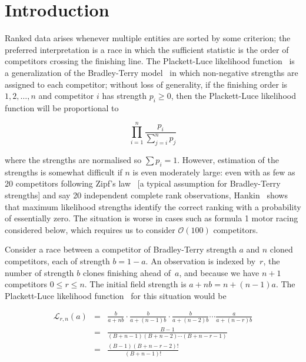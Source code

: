 \documentclass[ejs,noshowframe]{imsart}
\theoremstyle{plain}
\theoremstyle{definition}
\theoremstyle{remark}
\begin{document}
\section{Introduction}

Ranked data arises whenever multiple entities are sorted by some
criterion; the preferred interpretation is a race in which the
sufficient statistic is the order of competitors crossing the
finishing line.  The Plackett-Luce likelihood
function~\cite{luce1959,plackett1975} is a generalization of the
Bradley-Terry model~\cite{bradley1952} in which non-negative strengths
are assigned to each competitor; without loss of generality, if the
finishing order is $1,2,\ldots,n$ and competitor $i$ has strength
$p_i\geqslant 0$, then the Plackett-Luce likelihood function will be
proportional to

\begin{equation}\label{plackettluce}
\prod_{i=1}^n\frac{p_i}{\sum_{j=i}^np_j}
\end{equation}

\noindent where the strengths are normalised so $\sum p_i=1$.
However, estimation of the strengths is somewhat difficult if $n$ is
even moderately large: even with as few as 20 competitors following
Zipf's law~\cite{zipf1949} [a typical assumption for Bradley-Terry
  strengths] and say 20 independent complete rank observations,
Hankin~\cite{hankin2017_rmd} shows that maximum likelihood strengths
identify the correct ranking with a probability of essentially zero.
The situation is worse in cases such as formula 1 motor racing
considered below, which requires us to consider ${\mathcal O}(100)$
competitors.

Consider a race between a competitor of Bradley-Terry strength $a$ and
$n$ cloned competitors, each of strength $b=1-a$.  An observation is
indexed by~$r$, the number of strength $b$ clones finishing ahead
of~$a$, and because we have $n+1$ competitors %
$0\leqslant r\leqslant n$.  The initial field strength is
$a+nb=n+(n-1)a$.  The Plackett-Luce likelihood
function~\cite{luce1959,plackett1975} for this situation would be

\begin{eqnarray}\label{likeforrn1}
  \mathcal{L}_{r,n}(a) &=&
\frac{b}{a+ n   b}\cdot
\frac{b}{a+(n-1)b}\cdot
\frac{b}{a+(n-2)b}\cdots
\frac{a}{a+(n-r)b}\\ \label{likeforrn2}
&=& \frac{B-1}{(B+n-1)(B+n-2)\cdots(B+n-r-1)}\\ \label{likeforrn3}
&=& \frac{(B-1)(B+n-r-2)!}{(B+n-1)!}
\end{eqnarray}
\end{document}
